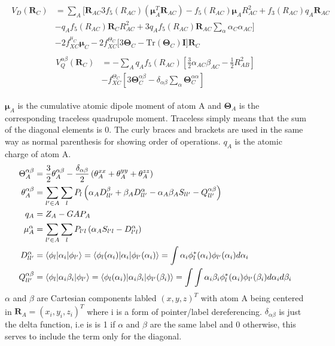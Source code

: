 \begin{align}
    \begin{split}
        V_D(\pmb{R}_C)
            &= \sum_A \Biggl[
                \pmb{R}_{AC}3f_5(R_{AC})(\pmb{\mu}_A^T\pmb{R}_{AC}) -
                f_5(R_{AC})\pmb{\mu}_AR^2_{AC} + 
                f_3(R_{AC})q_A\pmb{R}_{AC}\\
            &-q_Af_5(R_{AC})\pmb{R}_CR_{AC}^2 + 
                3q_Af_5(R_{AC})\pmb{R}_{AC}\sum_\alpha\alpha_C\alpha_{AC}\Biggr]\\
      &-2f_{XC}^{\mu_C}\pmb\mu_C - 2f_{XC}^{\Theta_C}\biggl[3\pmb\Theta_C-\text{Tr}(\pmb\Theta_C)\pmb I\biggr]\pmb R_C
    \end{split}
\end{align}
\begin{align}
    \begin{split}
        V_Q^{\alpha\beta}(\pmb{R}_C)
            &= -\sum_A q_Af_5(R_{AC})\left[          
                \frac{3}{2}\alpha_{AC}\beta_{AC}- \frac{1}{2}R_{AB}^2 %
                \right]\\
        &-f_{XC}^{\Theta_C}\left[3\pmb\Theta_C^{\alpha\beta}-\delta_{\alpha\beta}\sum_\alpha\pmb\Theta_C^{\alpha\alpha}\right]
    \end{split}
\end{align}

$\pmb{\mu}_A$ is the cumulative atomic dipole moment of atom A and $\pmb{\Theta}_A$ is the corresponding traceless quadrupole moment. Traceless simply means that the sum of the diagonal elements is 0. The curly braces and brackets are used in the same way as normal parenthesis for showing order of operations. $q_A$ is the atomic charge of atom A. 
\begin{align}
    \Theta_A^{\alpha\beta} &= \frac{3}{2} \theta_A^{\alpha\beta} - \frac{\delta_{\alpha\beta}}{2} \left( \theta_A^{xx} + \theta_A^{yy} + \theta_A^{zz} \right)\\
    \theta_A^{\alpha\beta} &= \sum_{l' \in A} \sum_{l} P_{l} \left( \alpha_A D_{ll'}^{\beta} + \beta_A D_{ll'}^{\alpha} - \alpha_A \beta_A S_{ll'} - Q_{ll'}^{\alpha\beta} \right)\\
    q_A &= Z_A - GAP_A\\
    \mu_A^{\alpha} &= \sum_{l' \in A} \sum_{l} P_{l'l} \left( \alpha_A S_{l'l} - D_{l'l}^{\alpha} \right)\\
    D_{ll'}^{\alpha} &= \braket{ \phi_{l} | \alpha_i | \phi_{l'}} = \braket{ \phi_{l}(\alpha_i) | \alpha_i | \phi_{l'}(\alpha_i)} = \int \alpha_i\phi_l^*(\alpha_i)\phi_{l'}(\alpha_i)d\alpha_i\\
    Q_{ll'}^{\alpha\beta} &= \braket{ \phi_{l} | \alpha_i\beta_i | \phi_{l'}} = \braket{ \phi_{l}(\alpha_i) | \alpha_i\beta_i | \phi_{l'}(\beta_i)} = \int \int \alpha_i\beta_i\phi_l^*(\alpha_i)\phi_{l'}(\beta_i)d\alpha_id\beta_i
\end{align}
$\alpha$ and $\beta$ are Cartesian components labled $(x,y,z)^T$ with atom A being centered in $\pmb{R}_A = (x_i,y_i,z_i)^T$ where i is a form of pointer/label dereferencing. $\delta_{\alpha\beta}$ is just the delta function, i.e is is 1 if $\alpha$ and $\beta$ are the same label and 0 otherwise, this serves to include the term only for the diagonal. 


